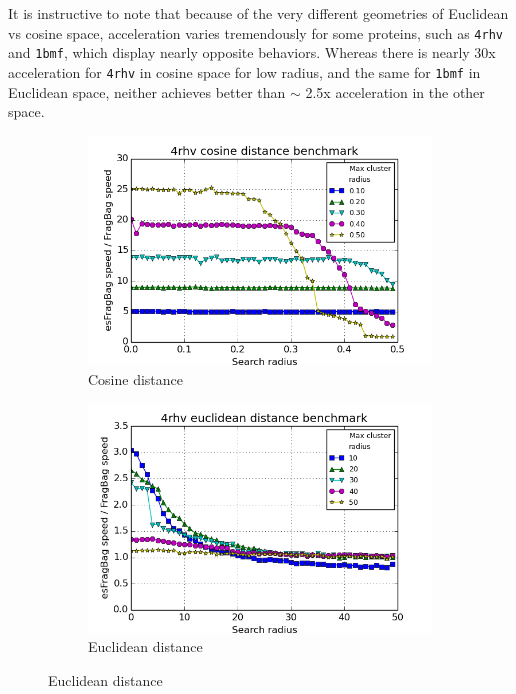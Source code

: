 \documentclass[review,preprint,12pt]{elsarticle}
\theoremstyle{definition}
\theoremstyle{remark}
\numberwithin{equation}{section}
\begin{document}
It is instructive to note that because of the very different geometries of Euclidean vs cosine space, acceleration varies tremendously for some proteins, such as \texttt{4rhv} and \texttt{1bmf}, which display nearly opposite behaviors.
Whereas there is nearly 30x acceleration for \texttt{4rhv} in cosine space for low radius, and the same for \texttt{1bmf} in Euclidean space, neither achieves better than $\sim$ 2.5x acceleration in the other space.

\begin{figure}[tbp]
    \centering
    \begin{subfigure}[b]{0.38\textwidth}
        \caption{Cosine distance}
        \label{fig:fragbag_cosine}
        \includegraphics[width=1\textwidth]{assets/4rhv_cosine.png}
    \end{subfigure}%
    \begin{subfigure}[b]{0.38\textwidth}
        \caption{Euclidean distance}
        \label{fig:fragbag_euclid}
        \includegraphics[width=1\textwidth]{assets/4rhv_euclid.png}

\end{subfigure}
\end{figure}
\end{document}
